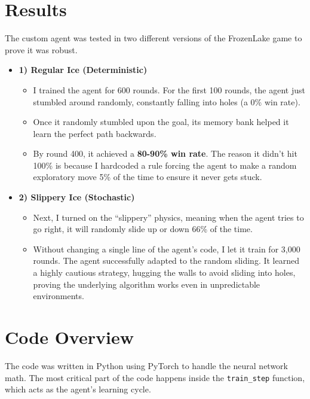 \documentclass[12pt]{article}
\begin{document}
\section{Results}
The custom agent was tested in two different versions of the FrozenLake game to prove it was robust.

\begin{itemize}[label=$\bullet$]
    \item \textbf{1) Regular Ice (Deterministic)}
    \begin{itemize}[label=$\circ$]
        \item I trained the agent for 600 rounds. For the first 100 rounds, the agent just stumbled around randomly, constantly falling into holes (a 0\% win rate). 
        \item Once it randomly stumbled upon the goal, its memory bank helped it learn the perfect path backwards. 
        \item By round 400, it achieved a \textbf{80-90\% win rate}. The reason it didn't hit 100\% is because I hardcoded a rule forcing the agent to make a random exploratory move 5\% of the time to ensure it never gets stuck.
    \end{itemize}
    
    \item \textbf{2) Slippery Ice (Stochastic)}
    \begin{itemize}[label=$\circ$]
        \item Next, I turned on the ``slippery'' physics, meaning when the agent tries to go right, it will randomly slide up or down 66\% of the time.
        \item Without changing a single line of the agent's code, I let it train for 3,000 rounds. The agent successfully adapted to the random sliding. It learned a highly cautious strategy, hugging the walls to avoid sliding into holes, proving the underlying algorithm works even in unpredictable environments.
    \end{itemize}
\end{itemize}

\section{Code Overview}
The code was written in Python using PyTorch to handle the neural network math. The most critical part of the code happens inside the \texttt{train\_step} function, which acts as the agent's learning cycle.
\end{document}
